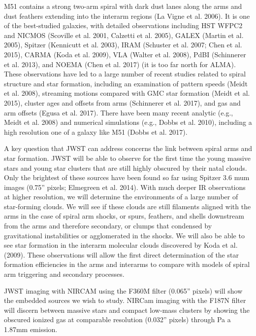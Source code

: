 \documentclass[12pt]{article}
\begin{document}
M51 contains a strong two-arm spiral with dark dust lanes along the arms and dust feathers extending into the interarm regions (La Vigne et al. 2006). It is one of the best-studied galaxies, with detailed observations including HST WFPC2 and NICMOS (Scoville et al. 2001, Calzetti et al. 2005), GALEX (Martin et al. 2005), Spitzer (Kennicutt et al. 2003), IRAM (Schuster et al. 2007; Chen et al. 2015), CARMA (Koda et al. 2009), VLA (Walter et al. 2008), PdBI (Schinnerer et al. 2013), and NOEMA (Chen et al. 2017) (it is too far north for ALMA). These observations have led to a large number of recent studies related to spiral structure and star formation, including an examination of pattern speeds (Meidt et al. 2008), streaming motions compared with GMC star formation (Meidt et al. 2015), cluster ages and offsets from arms (Schinnerer et al. 2017), and gas and arm offsets (Egusa et al. 2017). There have been many recent analytic (e.g., Meidt et al. 2008) and numerical simulations (e.g., Dobbs et al. 2010), including a high resolution one of a galaxy like M51 (Dobbs et al. 2017).  
 
A key question that JWST can address concerns the link between spiral arms and star formation.  JWST will be able to observe for the first time the young massive stars and young star clusters that are still highly obscured by their natal clouds. Only the brightest of these sources have been found so far using Spitzer 3.6 mum images (0.75” pixels; Elmegreen et al. 2014). With much deeper IR observations at higher resolution, we will determine the environments of a large number of star-forming clouds. We will see if these clouds are still filaments aligned with the arms in the case of spiral arm shocks, or spurs, feathers, and shells downstream from the arms and therefore secondary, or clumps that condensed by gravitational instabilities or agglomerated in the shocks. We will also be able to see star formation in the interarm molecular clouds discovered by Koda et al. (2009).  These observations will allow the first direct determination of the star formation efficiencies in the arms and interarms to compare with models of spiral arm triggering and secondary processes.
 
JWST imaging with NIRCAM using the F360M filter (0.065” pixels) will show the embedded sources we wish to study. NIRCam imaging with the F187N filter will discern between massive stars and compact low-mass clusters by showing the obscured ionized gas at comparable resolution (0.032” pixels) through Pa a 1.87mm emission.
 
\end{document}
